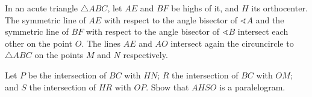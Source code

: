 In an acute triangle $\triangle{ABC}$,  let $AE$ and $BF$ be highs of it, and $H$ its orthocenter. The symmetric line of $AE$ with respect to the angle bisector of $\sphericalangle{A}$ and the symmetric line of $BF$ with respect to the angle bisector of $\sphericalangle{B}$ intersect each other on the point $O$. The lines $AE$ and $AO$ intersect again the circuncircle to $\triangle{ABC}$ on the points $M$ and $N$ respectively.

Let $P$ be the intersection of $BC$ with $HN$; $R$ the intersection of $BC$ with $OM$; and $S$ the intersection of $HR$ with $OP$. Show that $AHSO$ is a paralelogram.